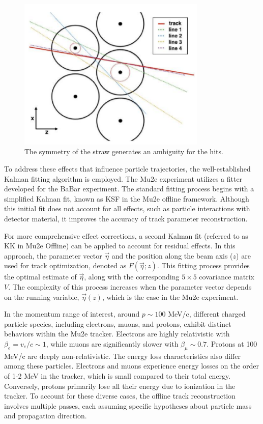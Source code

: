 \begin{figure}[!h]
    \centering
    \includegraphics[width =0.8\textwidth]{figures/png/Screenshot_20240810_171118.png}
    \caption[The symmetry of the straw generates an ambiguity for the hits.]{The 
    symmetry of the straw generates an ambiguity for the hits.}
    \label{fig:trackam}
\end{figure}
To address these effects that influence particle trajectories, 
the well-established Kalman fitting algorithm is employed. The 
Mu2e experiment utilizes a fitter developed for the BaBar experiment. 
The standard fitting process begins with a simplified Kalman fit, 
known as KSF in the Mu2e offline framework. Although this initial 
fit does not account for all effects, such as particle interactions 
with detector material, it improves the accuracy of track parameter reconstruction.

For more comprehensive effect corrections, a second Kalman fit 
(referred to as KK in Mu2e Offline) can be applied to account 
for residual effects. In this approach, the parameter vector 
$\vec{\eta}$ and the position along the beam axis ($z$) are used 
for track optimization, denoted as $F(\vec{\eta}; z)$. This fitting 
process provides the optimal estimate of $\vec{\eta}$, along with 
the corresponding $5 \times 5$ covariance matrix $V$. The 
complexity of this process increases when the parameter vector 
depends on the running variable, $\vec{\eta}(z)$, which is the 
case in the Mu2e experiment.

In the momentum range of interest, around $p \sim 100$ MeV/c, 
different charged particle species, including electrons, muons, 
and protons, exhibit distinct behaviors within the Mu2e tracker. 
Electrons are highly relativistic with $\beta_e = v_e/c \sim 1$, 
while muons are significantly slower with $\beta_\mu \sim 0.7$. 
Protons at 100 MeV/c are deeply non-relativistic. The energy loss 
characteristics also differ among these particles. Electrons and 
muons experience energy losses on the order of 1-2 MeV in the tracker, 
which is small compared to their total energy. Conversely, protons 
primarily lose all their energy due to ionization in the tracker. 
To account for these diverse cases, the offline track reconstruction 
involves multiple passes, each assuming specific hypotheses about 
particle mass and propagation direction.



